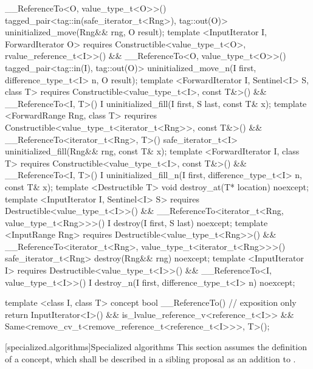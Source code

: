 {\begin{codeblock}
           __ReferenceTo<O, value_type_t<O>>()
    tagged_pair<tag::in(safe_iterator_t<Rng>), tag::out(O)>
    uninitialized_move(Rng&& rng, O result);
template <InputIterator I, ForwardIterator O>
  requires Constructible<value_type_t<O>, rvalue_reference_t<I>>() &&
           __ReferenceTo<O, value_type_t<O>>()
    tagged_pair<tag::in(I), tag::out(O)>
    uninitialized_move_n(I first, difference_type_t<I> n, O result);
template <ForwardIterator I, Sentinel<I> S, class T>
  requires Constructible<value_type_t<I>, const T&>() &&
           __ReferenceTo<I, T>()
  I uninitialized_fill(I first, S last, const T& x);
template <ForwardRange Rng, class T>
  requrires Constructible<value_type_t<iterator_t<Rng>>, const T&>() &&
            __ReferenceTo<iterator_t<Rng>, T>()
  safe_iterator_t<I>
  uninitialized_fill(Rng&& rng, const T& x);
template <ForwardIterator I, class T>
  requires Constructible<value_type_t<I>, const T&>() &&
           __ReferenceTo<I, T>()
  I uninitialized_fill_n(I first, difference_type_t<I> n, const T& x);
template <Destructible T>
  void destroy_at(T* location) noexcept;
template <InputIterator I, Sentinel<I> S>
  requires Destructible<value_type_t<I>>() &&
           __ReferenceTo<iterator_t<Rng, value_type_t<Rng>>>()
    I destroy(I first, S last) noexcept;
template <InputRange Rng>
  requires Destructible<value_type_t<Rng>>() &&
           __ReferenceTo<iterator_t<Rng>, value_type_t<iterator_t<Rng>>>()
    safe_iterator_t<Rng> destroy(Rng&& rng) noexcept;
template <InputIterator I>
  requires Destructible<value_type_t<I>>() &&
           __ReferenceTo<I, value_type_t<I>>()
    I destroy_n(I first, difference_type_t<I> n) noexcept;

template <class I, class T>
concept bool __ReferenceTo() { // exposition only
  return InputIterator<I>() &&
    is_lvalue_reference_v<reference_t<I>> &&
    Same<remove_cv_t<remove_reference_t<reference_t<I>>>, T>();
}
\end{codeblock}
} %

\setcounter{subsection}{9}
[specialized.algorithms]{Specialized algorithms}
This section assumes the definition of a  concept, which shall be described in a sibling
proposal as an addition to .

